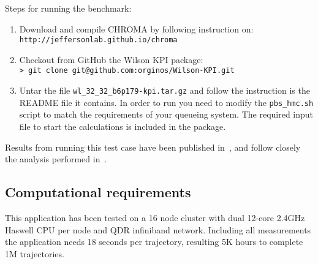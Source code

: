 \documentclass[11pt,a4paper]{article}
\begin{document}
\noindent
Steps for running the benchmark:
\begin{enumerate}
\item	 Download and compile CHROMA by following instruction on:\\
{\tt http://jeffersonlab.github.io/chroma }
\item Checkout from GitHub the Wilson KPI package:\\
	{\tt > git clone git@github.com:orginos/Wilson-KPI.git}
\item Untar the file {\tt wl\_32\_32\_b6p179-kpi.tar.gz} and follow the instruction is the README file it contains. In order to run you need to modify the {\tt pbs\_hmc.sh} script to match the requirements of your queueing system. The required input file to start the calculations is included in the package.
\end{enumerate}

Results from running this test case have been published in~\cite{Gambhir:2015nda},
and follow closely the analysis performed in~\cite{Schaefer:2010hu}.

\subsection{Computational requirements}
 This application has been tested on a 16 node cluster with dual 12-core 2.4GHz Haswell CPU per node and QDR infiniband network. Including all measurements the application needs 18 seconds per trajectory, resulting 5K hours to complete 1M trajectories.
 



\end{document}
